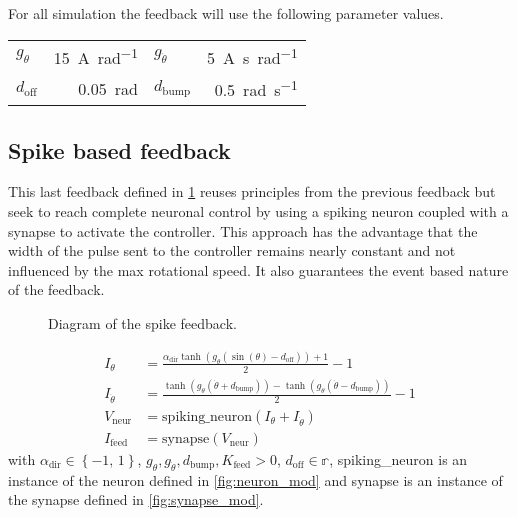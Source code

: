 For all simulation the feedback will use the following parameter values.
{

\large\centering
\begin{tabular}{lr|lr}
    $g_\theta$      & \qty{15}{\ampere\per\radian}   & $g_{\dot{\theta}}$    & \qty{5}{\ampere\second\per\radian}\\
    $d_\text{off}$ & \qty{0.05}{\radian}  & $d_\text{bump}$       & \qty{0.5}{\radian\per\second}
\end{tabular}

}

\subsection{Spike based feedback}

This last feedback defined in \cref{fig:spike_feed} reuses principles from the previous feedback but seek to reach complete neuronal control by using a spiking neuron coupled with a synapse to activate the controller. 
This approach has the advantage that the width of the pulse sent to the controller remains nearly constant and not influenced by the max rotational speed.
It also guarantees the event based nature of the feedback.

\begin{figure}[!htb]
    \centering
    \caption{Diagram of the spike feedback.}
    \label{fig:spike_feed}
\end{figure}

\begin{align}
    I_\theta &= \frac{\alpha_\text{dir}\tanh\left(g_\theta\left(\sin\left(\theta\right)-d_\text{off}\right)\right) + 1}{2} - 1\\
    I_{\dot{\theta}} &= \frac{\tanh\left(g_{\dot{\theta}}\left(\dot{\theta}+d_\text{bump}\right)\right) -\tanh\left(g_{\dot{\theta}}\left(\dot{\theta}-d_\text{bump}\right)\right)}{2}-1\\
    V_\text{neur} &= \text{spiking\_neuron}\left(I_\theta + I_{\dot{\theta}}\right)\\
    I_\text{feed} &= \text{synapse}\left(V_\text{neur}\right)
\end{align}
with $\alpha_\text{dir} \in \left\{-1,\,1\right\}$, $g_\theta, g_{\dot{\theta}}, d_\text{bump}, K_\text{feed} > 0$, $d_\text{off} \in \mathbb{r}$, spiking\_neuron is an instance of the neuron defined in \cref{fig:neuron_mod} and synapse is an instance of the synapse defined in \cref{fig:synapse_mod}.

